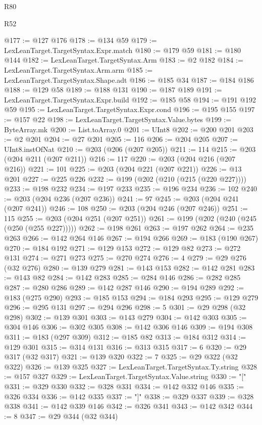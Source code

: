 \begin{lexlean}{R80}
\begin{lexlean}{R52}
\begin{coremodule}
{{{{{{{{{{{{{{{{{{{{{{{{{{{{{{{{{{{{{{{{{{{{{{{{{{{{{{{{{{{{{{{{{{{{{{{{{{{{{{{{{{{{{{{{{{{{{{{{{{{{{{{{{{{{{{{{{{{{{{{{{{{{{{{{{{{{{{{{{{{{{{{{{{{{{{{{{{{{{{{{{{{{{{{{{{{{{{{{{{{{{{{{{{{{{{{{{{{{{{@177 := @127 @176
@178 := @134 @59
@179 := LexLeanTarget.TargetSyntax.Expr.match
@180 := @179 @59
@181 := @180 @144
@182 := LexLeanTarget.TargetSyntax.Arm
@183 := @2 @182
@184 := LexLeanTarget.TargetSyntax.Arm.arm
@185 := LexLeanTarget.TargetSyntax.Shape.adt
@186 := @185 @34
@187 := @184 @186
@188 := @129 @58
@189 := @188 @131
@190 := @187 @189
@191 := LexLeanTarget.TargetSyntax.Expr.build
@192 := @185 @58
@194 := @191 @192 @59
@195 := LexLeanTarget.TargetSyntax.Expr.cond
@196 := @195 @155
@197 := @157 @22
@198 := LexLeanTarget.TargetSyntax.Value.bytes
@199 := ByteArray.mk
@200 := List.toArray.{0}
@201 := UInt8
@202 := @200 @201
@203 := @2 @201
@204 := @27 @201
@205 := 116
@206 := @204 @205
@207 := UInt8.instOfNat
@210 := @203 (@206 (@207 @205))
@211 := 114
@215 := @203 (@204 @211 (@207 @211))
@216 := 117
@220 := @203 (@204 @216 (@207 @216))
@221 := 101
@225 := @203 (@204 @221 (@207 @221))
@226 := @13 @201
@227 := @225 @226
@232 := @199 (@202 (@210 (@215 (@220 @227))))
@233 := @198 @232
@234 := @197 @233
@235 := @196 @234
@236 := 102
@240 := @203 (@204 @236 (@207 @236))
@241 := 97
@245 := @203 (@204 @241 (@207 @241))
@246 := 108
@250 := @203 (@204 @246 (@207 @246))
@251 := 115
@255 := @203 (@204 @251 (@207 @251))
@261 := @199 (@202 (@240 (@245 (@250 (@255 @227)))))
@262 := @198 @261
@263 := @197 @262
@264 := @235 @263
@266 := @142 @264 @146
@267 := @194 @266
@269 := @183 (@190 @267)
@270 := @184 @192
@271 := @129 @153
@272 := @129 @82
@273 := @272 @131
@274 := @271 @273
@275 := @270 @274
@276 := 4
@279 := @29 @276 (@32 @276)
@280 := @139 @279
@281 := @143 @153
@282 := @142 @281
@283 := @143 @82
@284 := @142 @283
@285 := @284 @146
@286 := @282 @285
@287 := @280 @286
@289 := @142 @287 @146
@290 := @194 @289
@292 := @183 (@275 @290)
@293 := @185 @153
@294 := @184 @293
@295 := @129 @279
@296 := @295 @131
@297 := @294 @296
@298 := 5
@301 := @29 @298 (@32 @298)
@302 := @139 @301
@303 := @143 @279
@304 := @142 @303
@305 := @304 @146
@306 := @302 @305
@308 := @142 @306 @146
@309 := @194 @308
@311 := @183 (@297 @309)
@312 := @185 @82
@313 := @184 @312
@314 := @129 @301
@315 := @314 @131
@316 := @313 @315
@317 := 6
@320 := @29 @317 (@32 @317)
@321 := @139 @320
@322 := 7
@325 := @29 @322 (@32 @322)
@326 := @139 @325
@327 := LexLeanTarget.TargetSyntax.Ty.string
@328 := @157 @327
@329 := LexLeanTarget.TargetSyntax.Value.string
@330 := "["
@331 := @329 @330
@332 := @328 @331
@334 := @142 @332 @146
@335 := @326 @334
@336 := @142 @335
@337 := "]"
@338 := @329 @337
@339 := @328 @338
@341 := @142 @339 @146
@342 := @326 @341
@343 := @142 @342
@344 := 8
@347 := @29 @344 (@32 @344)
}}}}}}}}}}}}}}}}}}}}}}}}}}}}}}}}}}}}}}}}}}}}}}}}}}}}}}}}}}}}}}}}}}}}}}}}}}}}}}}}}}}}}}}}}}}}}}}}}}}}}}}}}}}}}}}}}}}}}}}}}}}}}}}}}}}}}}}}}}}}}}}}}}}}}}}}}}}}}}}}}}}}}}}}}}}}}}}}}}}}}}}}}}}}}}}}}}}}}}
\end{coremodule}
\end{lexlean}
\end{lexlean}
